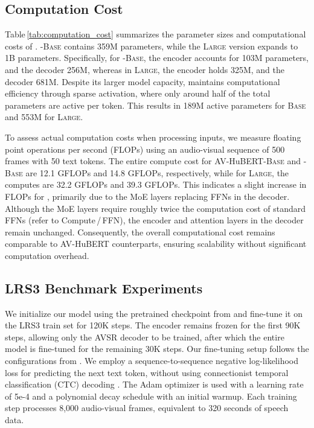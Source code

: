 \subsection{Computation Cost}
\label{appx:computation_cost}



Table\,\ref{tab:computation_cost} summarizes the parameter sizes and computational costs of \ourmodel. \ourmodel-\textsc{Base} contains 359M parameters, while the \textsc{Large} version expands to 1B parameters. Specifically, for \ourmodel-\textsc{Base}, the encoder accounts for 103M parameters, and the decoder 256M, whereas in \textsc{Large}, the encoder holds 325M, and the decoder 681M.
Despite its larger model capacity, \ourmodel maintains computational efficiency through sparse activation, where only around half of the total parameters are active per token. This results in 189M active parameters for \textsc{Base} and 553M for \textsc{Large}.

To assess actual computation costs when processing inputs, we measure floating point operations per second (FLOPs) using an audio-visual sequence of 500 frames with 50 text tokens. The entire compute cost for AV-HuBERT-\textsc{Base} and \ourmodel-\textsc{Base} are 12.1 GFLOPs and 14.8 GFLOPs, respectively, while for \textsc{Large}, the computes are 32.2 GFLOPs and 39.3 GFLOPs. This indicates a slight increase in FLOPs for \ourmodel, primarily due to the MoE layers replacing FFNs in the decoder. Although the MoE layers require roughly twice the computation cost of standard FFNs (refer to Compute\,/\,FFN), the encoder and attention layers in the decoder remain unchanged. Consequently, the overall computational cost remains comparable to AV-HuBERT counterparts, ensuring scalability without significant computation overhead.





\subsection{LRS3 Benchmark Experiments}
\label{appx:lrs3_benchmark}

We initialize our model using the pretrained checkpoint from \citep{shi2022learning} and fine-tune it on the LRS3 train set for 120K steps. The encoder remains frozen for the first 90K steps, allowing only the AVSR decoder to be trained, after which the entire model is fine-tuned for the remaining 30K steps. Our fine-tuning setup follows the configurations from \citep{shi2022robust}. We employ a sequence-to-sequence negative log-likelihood loss for predicting the next text token, without using connectionist temporal classification (CTC) decoding \citep{watanabe2017hybrid}. The Adam optimizer \cite{kingma2014adam} is used with a learning rate of 5e-4 and a polynomial decay schedule with an initial warmup. Each training step processes 8,000 audio-visual frames, equivalent to 320 seconds of speech data.

